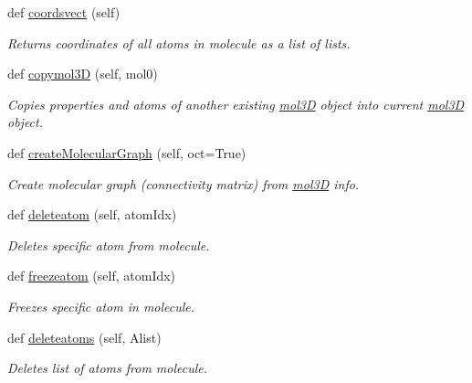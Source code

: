 \begin{DoxyCompactItemize}
def \hyperlink{classmolSimplify_1_1Classes_1_1mol3D_1_1mol3D_a305748724bd9be10c324302f046e3815}{coordsvect} (self)
\begin{DoxyCompactList}\small\item\em Returns coordinates of all atoms in molecule as a list of lists. \end{DoxyCompactList}\item 
def \hyperlink{classmolSimplify_1_1Classes_1_1mol3D_1_1mol3D_a09b722d1243e562169a88a591812a2ed}{copymol3D} (self, mol0)
\begin{DoxyCompactList}\small\item\em Copies properties and atoms of another existing \hyperlink{classmolSimplify_1_1Classes_1_1mol3D_1_1mol3D}{mol3D} object into current \hyperlink{classmolSimplify_1_1Classes_1_1mol3D_1_1mol3D}{mol3D} object. \end{DoxyCompactList}\item 
def \hyperlink{classmolSimplify_1_1Classes_1_1mol3D_1_1mol3D_a0199a2e25288c8624acfb67733cb699f}{create\+Molecular\+Graph} (self, oct=True)
\begin{DoxyCompactList}\small\item\em Create molecular graph (connectivity matrix) from \hyperlink{classmolSimplify_1_1Classes_1_1mol3D_1_1mol3D}{mol3D} info. \end{DoxyCompactList}\item 
def \hyperlink{classmolSimplify_1_1Classes_1_1mol3D_1_1mol3D_a6838664445a9896c703e0ffe2542ceef}{deleteatom} (self, atom\+Idx)
\begin{DoxyCompactList}\small\item\em Deletes specific atom from molecule. \end{DoxyCompactList}\item 
def \hyperlink{classmolSimplify_1_1Classes_1_1mol3D_1_1mol3D_a3d0541772724aa1a54e8cb6c8de77ea7}{freezeatom} (self, atom\+Idx)
\begin{DoxyCompactList}\small\item\em Freezes specific atom in molecule. \end{DoxyCompactList}\item 
def \hyperlink{classmolSimplify_1_1Classes_1_1mol3D_1_1mol3D_a98613e0d849dd341b6cec837877e214b}{deleteatoms} (self, Alist)
\begin{DoxyCompactList}\small\item\em Deletes list of atoms from molecule. \end{DoxyCompactList}\item 

\end{DoxyCompactItemize}
